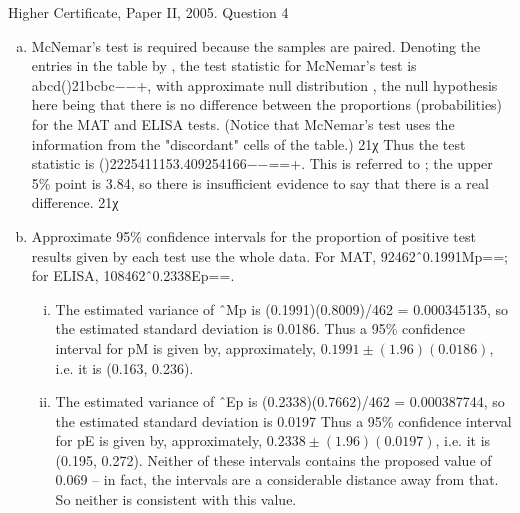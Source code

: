 \documentclass[a4paper,12pt]{article}
\begin{document}
Higher Certificate, Paper II, 2005. Question 4
\begin{enumerate}[(a)]
    \item McNemar's test is required because the samples are paired.
Denoting the entries in the table by , the test statistic for McNemar's test is abcd()21bcbc−−+, with approximate null distribution , the null hypothesis here being that there is no difference between the proportions (probabilities) for the MAT and ELISA tests. (Notice that McNemar's test uses the information from the "discordant" cells of the table.) 21χ
Thus the test statistic is ()2225411153.409254166−−==+. This is referred to ; the upper 5\% point is 3.84, so there is insufficient evidence to say that there is a real difference. 21χ
    \item  Approximate 95\% confidence intervals for the proportion of positive test results given by each test use the whole data. For MAT, 92462ˆ0.1991Mp==; for ELISA, 108462ˆ0.2338Ep==.
    
\begin{enumerate}[(i)]
    \item  The estimated variance of ˆMp is (0.1991)(0.8009)/462 = 0.000345135, so the estimated standard deviation is 0.0186. Thus a 95\% confidence interval for pM is given by, approximately, $0.1991 \pm (1.96)(0.0186)$, i.e. it is (0.163, 0.236).
\item The estimated variance of ˆEp is (0.2338)(0.7662)/462 = 0.000387744, so the estimated standard deviation is 0.0197 Thus a 95\% confidence interval for pE is given by, approximately, $0.2338 \pm (1.96)(0.0197)$, i.e. it is (0.195, 0.272).
Neither of these intervals contains the proposed value of 0.069 – in fact, the intervals are a considerable distance away from that. So neither is consistent with this value.
\end{enumerate}

\end{enumerate}
\end{document}
